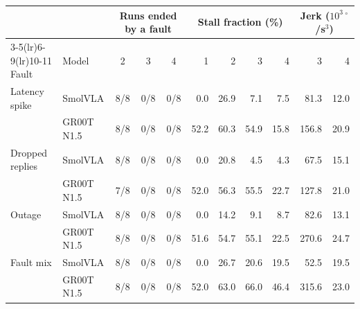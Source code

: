 \begin{tabular}{l l ccc rrrr rr}
\toprule
 & & \multicolumn{3}{c}{Runs ended by a fault} & \multicolumn{4}{c}{Stall fraction (\%)} & \multicolumn{2}{c}{Jerk ($10^3\,^\circ$/s$^3$)} \\
\cmidrule(lr){3-5}\cmidrule(lr){6-9}\cmidrule(lr){10-11}
Fault & Model & 2 & 3 & 4 & 1 & 2 & 3 & 4 & 3 & 4 \\
\midrule
Latency spike & SmolVLA & 8/8 & 0/8 & 0/8 & 0.0 & 26.9 & 7.1 & 7.5 & 81.3 & 12.0 \\
 & GR00T N1.5 & 8/8 & 0/8 & 0/8 & 52.2 & 60.3 & 54.9 & 15.8 & 156.8 & 20.9 \\
\addlinespace
Dropped replies & SmolVLA & 8/8 & 0/8 & 0/8 & 0.0 & 20.8 & 4.5 & 4.3 & 67.5 & 15.1 \\
 & GR00T N1.5 & 7/8 & 0/8 & 0/8 & 52.0 & 56.3 & 55.5 & 22.7 & 127.8 & 21.0 \\
\addlinespace
Outage & SmolVLA & 8/8 & 0/8 & 0/8 & 0.0 & 14.2 & 9.1 & 8.7 & 82.6 & 13.1 \\
 & GR00T N1.5 & 8/8 & 0/8 & 0/8 & 51.6 & 54.7 & 55.1 & 22.5 & 270.6 & 24.7 \\
\addlinespace
Fault mix & SmolVLA & 8/8 & 0/8 & 0/8 & 0.0 & 26.7 & 20.6 & 19.5 & 52.5 & 19.5 \\
 & GR00T N1.5 & 8/8 & 0/8 & 0/8 & 52.0 & 63.0 & 66.0 & 46.4 & 315.6 & 23.0 \\
\bottomrule
\end{tabular}
